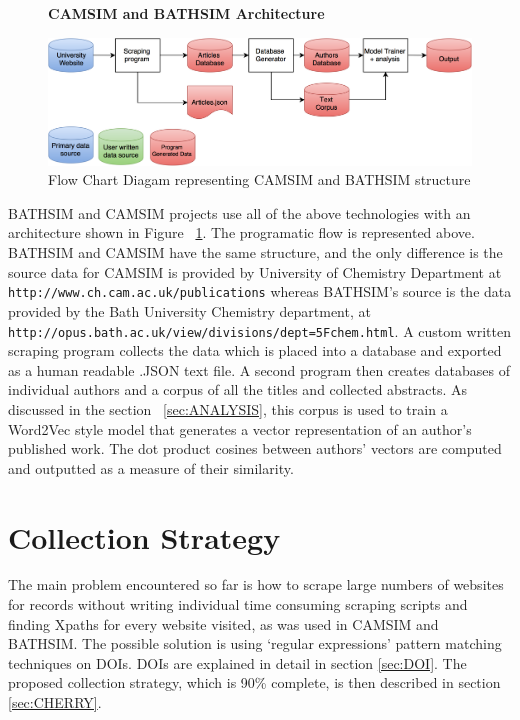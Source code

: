 \documentclass[11pt, oneside]{article}   	%
\begin{document}
\begin{figure}
    \centering
    \textbf{CAMSIM and BATHSIM Architecture}\par\medskip
    \includegraphics[scale=0.23]{CAMSIM.png}
    \caption{Flow Chart Diagam representing CAMSIM and BATHSIM structure \label{fig:CAMSIM}}
\end{figure}

BATHSIM and CAMSIM projects use all of the above technologies with an architecture shown in Figure ~\ref{fig:CAMSIM}. The programatic flow is represented above. BATHSIM and CAMSIM have the same structure, and the only difference is the source data for CAMSIM is provided by University of Chemistry Department at \texttt{ http://www.ch.cam.ac.uk/publications} whereas BATHSIM's source is the data provided by the Bath University Chemistry department, at \texttt{http://opus.bath.ac.uk/view/divisions/dept=5Fchem.html}. A custom written scraping program collects the data which is placed into a database and exported as a human readable .JSON text file. A second program then creates databases of individual authors and a corpus of all the titles and collected abstracts. As discussed in the section ~\ref{sec:ANALYSIS}, this corpus is used to train a Word2Vec style model that generates a vector representation of an author's published work. The dot product cosines between authors' vectors are computed and outputted as a measure of their similarity.
\section{Collection Strategy}
The main problem encountered so far is how to scrape large numbers of websites for records without writing individual time consuming scraping scripts and finding Xpaths for every website visited, as was used in CAMSIM and BATHSIM. The possible solution is using `regular expressions' pattern matching techniques on DOIs. DOIs are explained in detail in section \ref{sec:DOI}. The proposed collection strategy, which is 90\% complete, is then described in section \ref{sec:CHERRY}.
\end{document}
